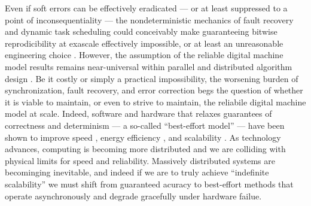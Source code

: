 Even if soft errors can be effectively eradicated --- or at least suppressed to a point of inconsequentiality --- the nondeterministic mechanics of fault recovery and dynamic task scheduling could conceivably make guaranteeing bitwise reprodicibility at exascale effectively impossible, or at least an unreasonable engineering choice \citep{dongarra2014applied}.
However, the assumption of the reliable digital machine model results remains near-universal within parallel and distributed algorithm design \citep{chakradhar2010best}.
Be it costly or simply a practical impossibility, the worsening burden of synchronization, fault recovery, and error correction begs the question of whether it is viable to maintain, or even to strive to maintain, the reliabile digital machine model at scale.
Indeed, software and hardware that relaxes guarantees of correctness and determinism --- a so-called ``best-effort model'' --- have been shown to improve speed \citep{chakrapani2008probabilistic}, energy efficiency \citep{chakrapani2008probabilistic,bocquet2018memory}, and scalability \citep{meng2009best}.
As technology advances, computing is becoming more distributed and we are colliding with physical limits for speed and reliability.
Massively distributed systems are becominging inevitable, and indeed if we are to truly achieve ``indefinite scalability'' \citep{ackley2011pursue} we must shift from guaranteed acuracy to best-effort methods that operate asynchronously and degrade gracefully under hardware failue.

